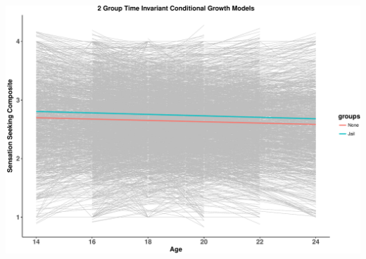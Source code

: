 \documentclass[ignorenonframetext,]{beamer}
\begin{document}
\begin{frame}

\includegraphics{Conditional_Models_files/figure-beamer/unnamed-chunk-10-1.pdf}

\end{frame}
\end{document}
